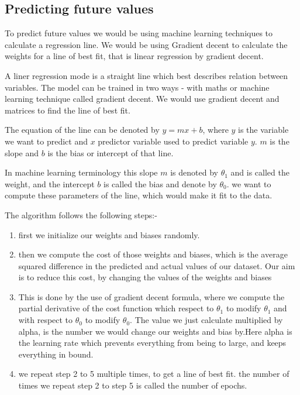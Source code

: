 \documentclass[a4paper, 11pt]{report}
\begin{document}
\subsection{Predicting future values}

To predict future values we would be using machine learning techniques to calculate a regression line. We would be using Gradient decent to calculate the weights for a line of best fit, that is linear regression by gradient decent.

A liner regression mode is a straight line which best describes relation between
variables. The model can be trained in two ways - with maths or machine learning
technique called gradient decent. We would use gradient decent and matrices to
find the line of best fit.

The equation of the line can be denoted by $y = mx + b$, where $y$ is the variable we want to
predict and $x$ predictor variable used to predict variable $y$. $m$ is the slope and $b$ is the bias or intercept of that line.

In machine learning terminology this slope $m$ is denoted by $\theta_1$ and is called the weight, and the intercept $b$ is called the bias and denote by $\theta_0$. we want to compute these parameters of the line, which would make it fit to the data.

The algorithm follows the following steps:- \\

\begin{enumerate}
    \item first we initialize our weights and biases randomly. \\

    \item then we compute the cost of those weights and biases, which is the
   average squared difference in the predicted and actual values of our
   dataset. Our aim is to reduce this cost, by changing the values of the weights
   and biases \\

   \item This is done by the use of gradient decent formula, where we compute
   the partial derivative of the cost function which respect to $\theta_1$
   to modify $\theta_1$ and with respect to $\theta_0$ to modify $\theta_0$. The
   value we just calculate multiplied by alpha, is the number we would
   change our weights and bias by.Here alpha is the learning rate which prevents everything from being to large, and keeps everything in bound. \\

   \item we repeat step 2 to 5 multiple times, to get a line of best fit. the
   number of times we repeat step 2 to step 5 is called the number of
   epochs. \\


\end{enumerate}
\end{document}
